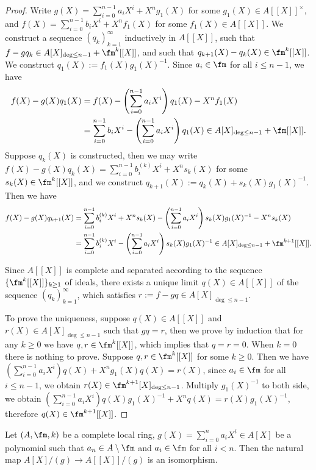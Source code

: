 \begin{proof}
\leanok
Write $g(X)=\sum_{i=0}^{n-1}a_iX^i+X^ng_1(X)$ for some $g_1(X)\in A[[X]]^\times$, and
$f(X)=\sum_{i=0}^{n-1}b_iX^i+X^nf_1(X)$ for some $f_1(X)\in A[[X]]$.
We construct a sequence $(q_k)_{k=1}^\infty$ inductively in $A[[X]]$,
such that $f-gq_k\in A[X]_{\deg\leq n-1}+\fm^k[[X]]$,
and such that $q_{k+1}(X)-q_k(X)\in\fm^k[[X]]$.
We construct $q_1(X):=f_1(X)g_1(X)^{-1}$.
Since $a_i\in\fm$ for all $i\leq n-1$, we have
\begin{align*}
f(X)-g(X)q_1(X)&=f(X)-\left(\sum_{i=0}^{n-1}a_iX^i\right)q_1(X)
-X^nf_1(X) \\
&=\sum_{i=0}^{n-1}b_iX^i-\left(\sum_{i=0}^{n-1}a_iX^i\right)q_1(X)
\in A[X]_{\deg\leq n-1}+\fm[[X]].
\end{align*}
Suppose $q_k(X)$ is constructed, then we may write
$f(X)-g(X)q_k(X)=\sum_{i=0}^{n-1}b_i^{(k)}X^i+X^ns_k(X)$
for some $s_k(X)\in\fm^k[[X]]$, and we construct
$q_{k+1}(X):=q_k(X)+s_k(X)g_1(X)^{-1}$. Then we have
\begin{align*}
f(X)-g(X)q_{k+1}(X)&=\sum_{i=0}^{n-1}b_i^{(k)}X^i+X^ns_k(X)
-\left(\sum_{i=0}^{n-1}a_iX^i\right)s_k(X)g_1(X)^{-1}
-X^ns_k(X) \\
&=\sum_{i=0}^{n-1}b_i^{(k)}X^i-\left(\sum_{i=0}^{n-1}a_iX^i\right)s_k(X)g_1(X)^{-1}
\in A[X]_{\deg\leq n-1}+\fm^{k+1}[[X]].
\end{align*}

Since $A[[X]]$ is complete and separated according to the sequence
$\{\fm^k[[X]]\}_{k\geq 1}$ of ideals, there exists a unique limit $q(X)\in A[[X]]$
of the sequence $(q_k)_{k=1}^\infty$, which satisfies $r:=f-gq\in A[X]_{\deg\leq n-1}$.

To prove the uniqueness, suppose $q(X)\in A[[X]]$ and $r(X)\in A[X]_{\deg\leq n-1}$
such that $gq=r$, then we prove by induction that for any $k\geq 0$
we have $q,r\in\fm^k[[X]]$, which implies that $q=r=0$.
When $k=0$ there is nothing to prove. Suppose $q,r\in\fm^k[[X]]$ for some $k\geq 0$.
Then we have $(\sum_{i=0}^{n-1}a_iX^i)q(X)+X^ng_1(X)q(X)=r(X)$,
since $a_i\in\fm$ for all $i\leq n-1$, we obtain $r(X)\in\fm^{k+1}[X]_{\deg\leq n-1}$.
Multiply $g_1(X)^{-1}$ to both side,
we obtain $(\sum_{i=0}^{n-1}a_iX^i)q(X)g_1(X)^{-1}+X^nq(X)=r(X)g_1(X)^{-1}$,
therefore $q(X)\in\fm^{k+1}[[X]]$.
\end{proof}

\begin{cor}
\label{isom-given-by-weierstrass-division}
\leanok
Let $(A,\fm,k)$ be a complete local ring,
$g(X)=\sum_{i=0}^n a_iX^i\in A[X]$ be a polynomial
such that $a_n\in A\setminus\fm$ and $a_i\in\fm$ for all $i<n$.
Then the natural map $A[X]/(g)\to A[[X]]/(g)$
is an isomorphism.
\end{cor}

